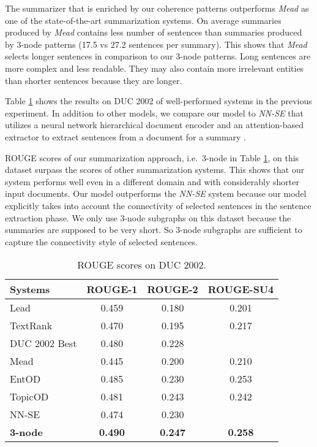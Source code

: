 The summarizer that is enriched by our coherence patterns outperforms \emph{Mead} as one of the state-of-the-art summarization systems. 
On average summaries produced by \emph{Mead} contains less number of sentences than summaries produced by 3-node patterns (17.5 vs 27.2 sentences per summary).
This shows that \emph{Mead} selects longer sentences in comparison to our 3-node patterns.  
Long sentences are more complex and less readable. 
They may also contain more irrelevant entities than shorter sentences because they are longer. 

Table \ref{tab:summary-duc} shows the results on DUC 2002 of well-performed  systems in the previous experiment. 
In addition to other models, we compare our model to \emph{NN-SE} that utilizes a neural network hierarchical document encoder and an \mbox{attention-based} extractor to extract sentences from a document for a summary \cite{chengjianpeng16}.

ROUGE scores of our summarization approach, i.e.\ 3-node in Table \ref{tab:summary-duc}, on this dataset surpass the scores of other summarization systems. 
This shows that our system performs well even in a different domain and with considerably shorter input documents. 
Our model outperforms the \emph{NN-SE} system because our model explicitly takes into account the connectivity of selected sentences in the sentence extraction phase. 
We only use 3-node subgraphs on this dataset because the summaries are supposed to be very short. 
So 3-node subgraphs are sufficient to capture the connectivity style of selected sentences. 


\begin{table}[!ht]
	\begin{center}
		\begin{tabular}{lccc}
			\toprule
			\textbf{Systems} 					& \textbf{ROUGE-1} 	& \textbf{ROUGE-2} 	& \textbf{ROUGE-SU4} \\
			\midrule
			Lead 						& 0.459 & 0.180 & 0.201	\\
			TextRank 					& 0.470 & 0.195 & 0.217	\\
			DUC 2002 Best 				& 0.480 & 0.228 & 		\\
			Mead 						& 0.445 & 0.200 & 0.210	\\
			EntOD						& 0.485 & 0.230 & 0.253 \\
			TopicOD 					& 0.481 & 0.243 & 0.242 \\
			NN-SE 						& 0.474 & 0.230 & 		\\
			\textbf{3-node} 						& \textbf{0.490} & \textbf{0.247} & \textbf{0.258}\\
			\bottomrule
		\end{tabular}
	\end{center}
	\caption{ROUGE scores on DUC 2002.}
	\label{tab:summary-duc}
\end{table}

